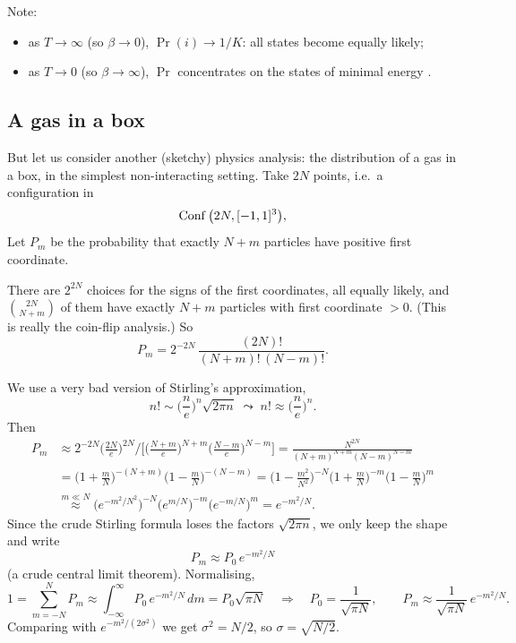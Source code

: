 \begin{remark}
Note:
\begin{itemize}
  \item as $T\to\infty$ (so $\beta\to0$), $\Pr(i)\to 1/K$: all states become equally likely;
  \item as $T\to 0$ (so $\beta\to\infty$), $\Pr$ concentrates on the states of minimal
    energy .
\end{itemize}
\end{remark}

\subsection{A gas in a box}
\label{L07:subsec:gas}

But let us consider another (sketchy) physics analysis: the distribution of a gas in a box,
in the simplest non-interacting setting. Take $2N$ points, i.e.\ a configuration in
\[
  \operatorname{Conf}\big(2N,[-1,1]^3\big),
\]
 Let $P_m$ be the probability that exactly $N+m$
particles have positive first coordinate.

There are $2^{2N}$ choices for the signs of the first coordinates, all equally likely, and
$\binom{2N}{N+m}$ of them have exactly $N+m$ particles with first coordinate $>0$. (This is
really the coin-flip analysis.) So
\[
  P_m=2^{-2N}\,\frac{(2N)!}{(N+m)!\,(N-m)!}.
\]

We use a very bad version of Stirling's approximation,
\[
  n!\sim\Big(\frac ne\Big)^n\sqrt{2\pi n}\;\leadsto\;n!\approx\Big(\frac ne\Big)^n .
\]
Then
\begin{align*}
  P_m&\approx 2^{-2N}\Big(\frac{2N}{e}\Big)^{2N}\Big/
     \Big[\Big(\frac{N+m}{e}\Big)^{N+m}\Big(\frac{N-m}{e}\Big)^{N-m}\Big]
   =\frac{N^{2N}}{(N+m)^{N+m}(N-m)^{N-m}}\\
  &=\Big(1+\frac mN\Big)^{-(N+m)}\Big(1-\frac mN\Big)^{-(N-m)}
   =\Big(1-\frac{m^2}{N^2}\Big)^{-N}\Big(1+\frac mN\Big)^{-m}\Big(1-\frac mN\Big)^{m}\\
  &\overset{m\ll N}{\approx}\big(e^{-m^2/N^2}\big)^{-N}\big(e^{m/N}\big)^{-m}\big(e^{-m/N}\big)^{m}
   = e^{-m^2/N}.
\end{align*}
Since the crude Stirling formula loses the factors $\sqrt{2\pi n}$, we only keep the shape
and write
\[
  P_m\approx P_0\,e^{-m^2/N}
\]
(a crude central limit theorem). Normalising,
\[
  1=\sum_{m=-N}^{N}P_m\approx\int_{-\infty}^{\infty}P_0\,e^{-m^2/N}\,dm=P_0\sqrt{\pi N}
  \quad\Longrightarrow\quad
  P_0=\frac{1}{\sqrt{\pi N}},\qquad P_m\approx\frac{1}{\sqrt{\pi N}}\,e^{-m^2/N}.
\]
Comparing with $e^{-m^2/(2\sigma^2)}$ we get $\sigma^2=N/2$, so $\sigma=\sqrt{N/2}$.

